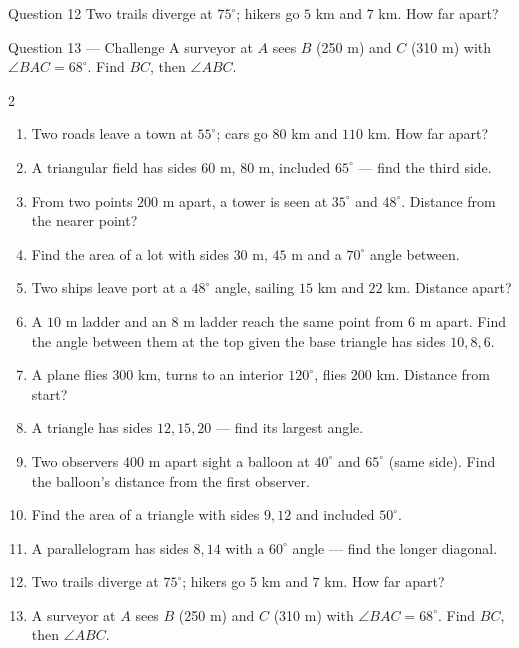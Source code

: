 \documentclass[11pt]{article}
\begin{document}
\begin{qbox}{Question 12}
Two trails diverge at $75^\circ$; hikers go $5$ km and $7$ km. How far apart?\workspace{2.4cm}
\end{qbox}

\begin{qbox}{Question 13 --- Challenge}
A surveyor at $A$ sees $B$ (250 m) and $C$ (310 m) with $\angle BAC=68^\circ$. Find $BC$, then $\angle ABC$.\workspace{3.4cm}
\end{qbox}

\clearpage
{}

\begin{recapbox}
\begin{multicols}{2}
\small
\begin{enumerate}[leftmargin=*,itemsep=3pt]
  \item Two roads leave a town at $55^\circ$; cars go $80$ km and $110$ km. How far apart?
  \item A triangular field has sides $60$ m, $80$ m, included $65^\circ$ — find the third side.
  \item From two points $200$ m apart, a tower is seen at $35^\circ$ and $48^\circ$. Distance from the nearer point?
  \item Find the area of a lot with sides $30$ m, $45$ m and a $70^\circ$ angle between.
  \item Two ships leave port at a $48^\circ$ angle, sailing $15$ km and $22$ km. Distance apart?
  \item A $10$ m ladder and an $8$ m ladder reach the same point from $6$ m apart. Find the angle between them at the top given the base triangle has sides $10,8,6$.
  \item A plane flies $300$ km, turns to an interior $120^\circ$, flies $200$ km. Distance from start?
  \item A triangle has sides $12,15,20$ — find its largest angle.
  \item Two observers $400$ m apart sight a balloon at $40^\circ$ and $65^\circ$ (same side). Find the balloon's distance from the first observer.
  \item Find the area of a triangle with sides $9,12$ and included $50^\circ$.
  \item A parallelogram has sides $8,14$ with a $60^\circ$ angle — find the longer diagonal.
  \item Two trails diverge at $75^\circ$; hikers go $5$ km and $7$ km. How far apart?
  \item A surveyor at $A$ sees $B$ (250 m) and $C$ (310 m) with $\angle BAC=68^\circ$. Find $BC$, then $\angle ABC$.
\end{enumerate}
\end{multicols}
\end{recapbox}
\end{document}
